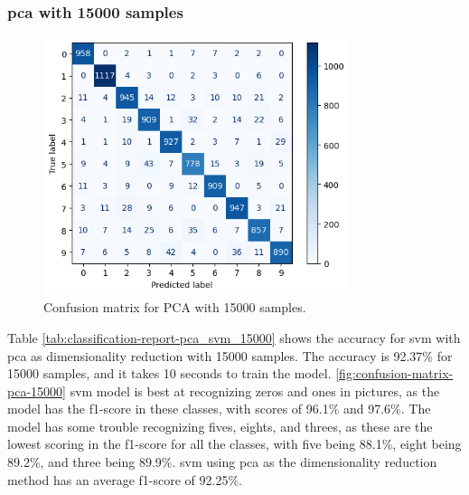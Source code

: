 \subsubsection{\gls{pca} with 15000 samples}\label{subsubsec:experiment-1-results-pca-15000}
\begin{figure}[htb!]
    \centering
    \includegraphics[width=0.8\textwidth]{figures/1-experiment/confusion_matrix_pca_svm_15000.png}
    \caption{Confusion matrix for PCA with 15000 samples.}
    \label{fig:confusion-matrix-pca-15000}
\end{figure}
Table \ref{tab:classification-report-pca_svm_15000} shows the accuracy for \gls{svm} with \gls{pca} as dimensionality reduction with 15000 samples. The accuracy is 92.37\% for 15000 samples, and it takes 10 seconds to train the model. \autoref{fig:confusion-matrix-pca-15000} \gls{svm} model is best at recognizing zeros and ones in pictures, as the model has the f1-score in these classes, with scores of 96.1\% and 97.6\%. The model has some trouble recognizing fives, eights, and threes, as these are the lowest scoring in the f1-score for all the classes, with five being 88.1\%, eight being 89.2\%, and three being 89.9\%. \gls{svm} using \gls{pca} as the dimensionality reduction method has an average f1-score of 92.25\%.

